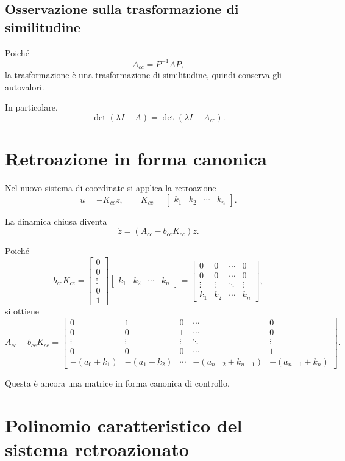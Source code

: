\subsection*{Osservazione sulla trasformazione di similitudine}

Poiché
\[
A_{cc}=P^{-1}AP,
\]
la trasformazione è una trasformazione di similitudine, quindi conserva gli autovalori.

In particolare,
\[
\det(\lambda I-A)=\det(\lambda I-A_{cc}).
\]

\section{Retroazione in forma canonica}

Nel nuovo sistema di coordinate si applica la retroazione
\[
u=-K_{cc}z,
\qquad
K_{cc}=
\begin{bmatrix}
k_1 & k_2 & \cdots & k_n
\end{bmatrix}.
\]

La dinamica chiusa diventa
\[
\dot z=(A_{cc}-b_{cc}K_{cc})z.
\]

Poiché
\[
b_{cc}K_{cc}
=
\begin{bmatrix}
0\\
0\\
\vdots\\
0\\
1
\end{bmatrix}
\begin{bmatrix}
k_1 & k_2 & \cdots & k_n
\end{bmatrix}
=
\begin{bmatrix}
0 & 0 & \cdots & 0\\
0 & 0 & \cdots & 0\\
\vdots & \vdots & \ddots & \vdots\\
k_1 & k_2 & \cdots & k_n
\end{bmatrix},
\]
si ottiene
\[
A_{cc}-b_{cc}K_{cc}
=
\begin{bmatrix}
0 & 1 & 0 & \cdots & 0\\
0 & 0 & 1 & \cdots & 0\\
\vdots & \vdots & \vdots & \ddots & \vdots\\
0 & 0 & 0 & \cdots & 1\\
-(a_0+k_1) & -(a_1+k_2) & \cdots & -(a_{n-2}+k_{n-1}) & -(a_{n-1}+k_n)
\end{bmatrix}.
\]

Questa è ancora una matrice in forma canonica di controllo.

\section{Polinomio caratteristico del sistema retroazionato}

